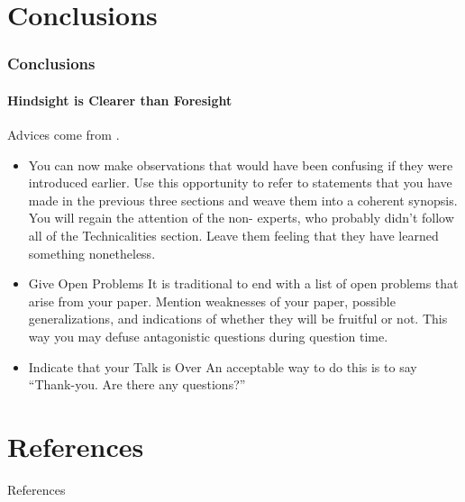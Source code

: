 \documentclass[11pt]{beamer}              %
\begin{document}
\section{Conclusions}
\begin{frame}
\frametitle{Conclusions}
\framesubtitle{Hindsight is Clearer than Foresight}
Advices come from \cite{spillman2000present}.
\begin{itemize}
\item You can now make observations that would have been confusing if they were introduced earlier. Use this opportunity to refer to statements that you have made in the previous three sections and weave them into a coherent synopsis. You will regain the attention of the non- experts, who probably didn’t follow all of the Technicalities section. Leave them feeling that they have learned something nonetheless.
\item Give Open Problems It is traditional to end with a list of open problems that arise from your paper. Mention weaknesses of your paper, possible generalizations, and indications of whether they will be fruitful or not. This way you may defuse antagonistic questions during question time.
\item Indicate that your Talk is Over
An acceptable way to do this is to say “Thank-you. Are there any questions?”\cite{einstein}
\end{itemize}

\end{frame}

\section*{References}
\begin{frame}{References}
\tiny


\end{frame}
\end{document}
